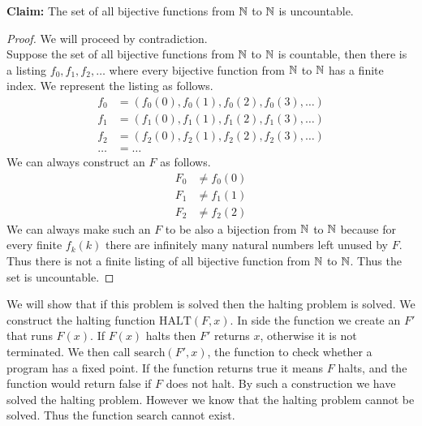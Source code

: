 \documentclass[11pt]{article}
\begin{document}
\begin{Parts}
    \begin{Answer}
        \textbf{Claim:} The set of all bijective functions from $\mathbb{N}$ to $\mathbb{N}$ is uncountable. 
        \begin{proof}
            We will proceed by contradiction. \\
            Suppose the set of all bijective functions from $\mathbb{N}$ to $\mathbb{N}$ is countable, then there is a listing $f_0,f_1,f_2,\ldots$ where
            every bijective function from $\mathbb{N}$ to $\mathbb{N}$ has a finite index. We represent the listing as follows. 
            \begin{align*}
                f_0 &= (f_0(0), f_0(1), f_0(2), f_0(3), \ldots) \\
                f_1 &= (f_1(0), f_1(1), f_1(2), f_1(3), \ldots) \\
                f_2 &= (f_2(0), f_2(1), f_2(2), f_2(3), \ldots) \\
                \ldots &= \ldots
            \end{align*}
            We can always construct an $F$ as follows. 
            \begin{align*}
                F_0 &\neq f_0(0) \\
                F_1 &\neq f_1(1) \\
                F_2 &\neq f_2(2)
            \end{align*}
            We can always make such an $F$ to be also a bijection from $\mathbb{N}$ to $\mathbb{N}$ because for every finite $f_k(k)$ there are infinitely 
            many natural numbers left unused by $F$. Thus there is not a finite listing of all bijective function from $\mathbb{N}$ to $\mathbb{N}$. Thus 
            the set is uncountable. 
        \end{proof}
    \end{Answer}

\end{Parts}

\newpage
{}

\begin{Answer}
    We will show that if this problem is solved then the halting problem is solved. We construct the halting function $\mathrm{HALT}(F,x)$. 
    In side the function we create an $F'$ that runs $F(x)$. If $F(x)$ halts then $F'$ returns $x$, otherwise it is not terminated. We then 
    call $\mathrm{search}(F', x)$, the function to check whether a program has a fixed point. If the function returns true it means $F$ halts, 
    and the function would return false if $F$ does not halt. By such a construction we have solved the halting problem. However we know that
    the halting problem cannot be solved. Thus the function $\mathrm{search}$ cannot exist. 
\end{Answer}
\end{document}
